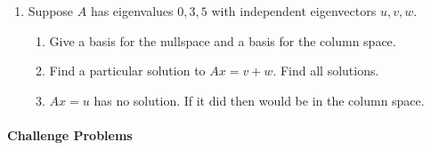 \documentclass[14pt, a4paper]{article}
\begin{document}
\begin{enumerate}
    \item Suppose $A$ has eigenvalues $0, 3, 5$ with independent eigenvectors $u, v, w$.
          \begin{enumerate}
              \item Give a basis for the nullspace and a basis for the column space.
              \item Find a particular solution to $Ax = v + w$. Find all solutions.
              \item $Ax = u$ has no solution. If it did then \underline{\hspace{1cm}} would be in the column space.
          \end{enumerate}
\end{enumerate}

\paragraph{Challenge Problems}
\end{document}
